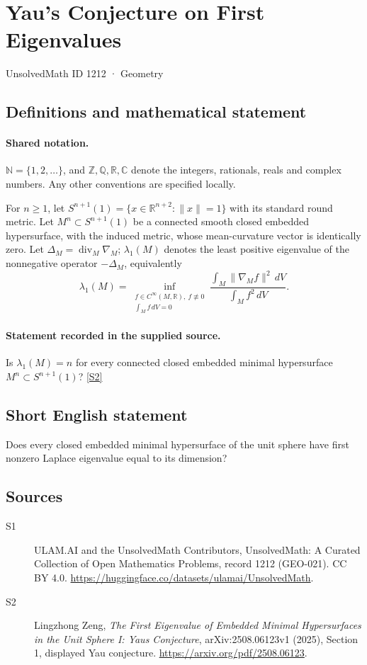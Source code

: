 \documentclass[11pt]{article}
\newcommand{\sref}[2]{\hyperlink{source:#1:#2}{[S#2]}}
\begin{document}
\setcounter{section}{1211}
\section{Yau's Conjecture on First Eigenvalues}\label{1212}
{\small\sffamily UnsolvedMath ID 1212 · Geometry}
\subsection{Definitions and mathematical statement}

\paragraph{Shared notation.}$\mathbb N=\{1,2,\ldots\}$, and $\mathbb Z,\mathbb Q,\mathbb R,\mathbb C$ denote the integers, rationals, reals and complex numbers. Any other conventions are specified locally.


For $n\geq1$, let $S^{n+1}(1)=\{x\in\mathbb R^{n+2}:\lVert x\rVert=1\}$ with its standard round metric. Let $M^n\subset S^{n+1}(1)$ be a connected smooth closed embedded hypersurface, with the induced metric, whose mean-curvature vector is identically zero. Let $\Delta_M=\operatorname{div}_M\nabla_M$; $\lambda_1(M)$ denotes the least positive eigenvalue of the nonnegative operator $-\Delta_M$, equivalently
\[
\lambda_1(M)=\inf_{\substack{f\in C^\infty(M,\mathbb R),\ f\not\equiv0\\\int_M f\,dV=0}}
\frac{\int_M\lVert\nabla_Mf\rVert^2\,dV}{\int_M f^2\,dV}.
\]
\paragraph{Statement recorded in the supplied source.}
Is $\lambda_1(M)=n$ for every connected closed embedded minimal hypersurface $M^n\subset S^{n+1}(1)$? \sref{1212}{2}

\subsection{Short English statement}
Does every closed embedded minimal hypersurface of the unit sphere have first nonzero Laplace eigenvalue equal to its dimension?
\subsection{Sources}
\begin{description}
\item[\hypertarget{source:1212:1}{S1}] ULAM.AI and the UnsolvedMath Contributors, UnsolvedMath: A Curated Collection of Open Mathematics Problems, record 1212 (GEO-021). CC BY 4.0. \url{https://huggingface.co/datasets/ulamai/UnsolvedMath}.
\item[\hypertarget{source:1212:2}{S2}] Lingzhong Zeng, \emph{The First Eigenvalue of Embedded Minimal Hypersurfaces in the Unit Sphere I: Yau\textquotesingle s Conjecture}, arXiv:2508.06123v1 (2025), Section 1, displayed Yau conjecture. \url{https://arxiv.org/pdf/2508.06123}.
\end{description}
\label{end:1212}
\end{document}
